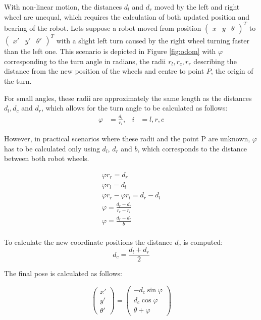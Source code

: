 With non-linear motion, the distances $d_{l}$ and $d_{r}$ moved by the left and right wheel are unequal, which requires the calculation of both updated position and bearing of the robot. 
Lets suppose a robot moved from position $\begin{pmatrix} x & y & \theta \end{pmatrix}^{T}$ to $\begin{pmatrix} x' & y' & \theta' \end{pmatrix}^{T}$ with a slight left turn caused by the right wheel turning faster than the left one. 
This scenario is depicted in Figure \ref{fig:odom} with $\varphi$ corresponding to the turn angle in radians, the radii $r_{l}, r_{c}, r_{r}$ describing the distance from the new position of the wheels and centre to point $P$, the origin of the turn. 

For small angles, these radii are approximately the same length as the distances $d_{l}, d_{c}$ and $d_{r}$, which allows for the turn angle to be calculated as follows:
\begin{align*}
	\varphi &= \frac{d_{i}}{r_{i}}, & i &= l, r, c  
\end{align*}

However, in practical scenarios where these radii and the point P are unknown, $\varphi$ has to be calculated only using $d_{l}$, $d_{r}$ and $b$, which corresponds to the distance between both robot wheels.

\begin{equation*}
	\begin{split}
		\varphi r_{r} = d_{r} \\
		\varphi r_{l} = d_{l} \\
		\varphi r_{r} - \varphi r_{l} = d_{r} - d_{l} \\
		\varphi = \frac{d_{r} - d_{l}}{r_{r} - r_{l}} \\ 
		\varphi = \frac{d_{r} - d_{l}}{b} \\
	\end{split}
\end{equation*}

To calculate the new coordinate positions the distance $d_{c}$ is computed:
\begin{equation*}
	d_{c} = \frac{d_{l} + d_{r}}{2}
\end{equation*}

The final pose is calculated as follows:

\begin{equation*}
	\begin{pmatrix}
		x' \\ 
		y' \\
		\theta'
	\end{pmatrix}
	= 
	\begin{pmatrix}
		-d_{c} \sin \varphi \\
		d_{c} \cos \varphi \\ 
		\theta + \varphi
	\end{pmatrix}
\end{equation*}


